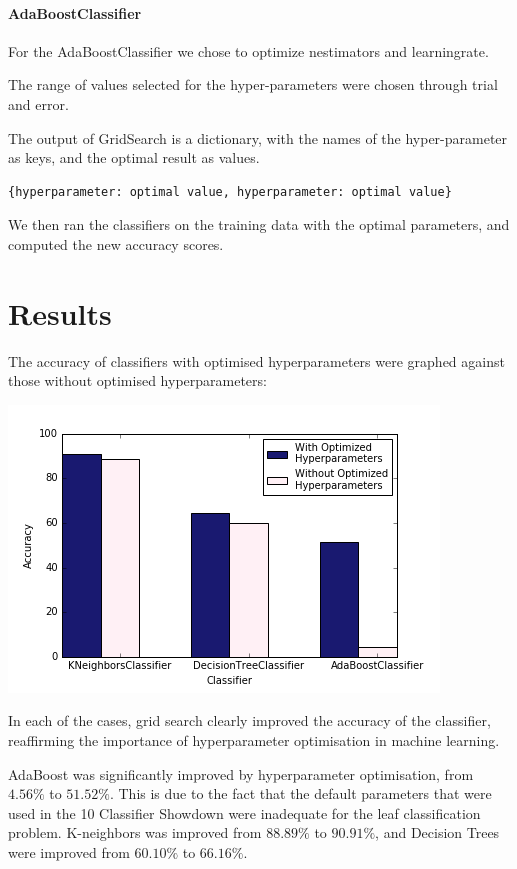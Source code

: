 \documentclass{article}
\begin{document}
		\paragraph{AdaBoostClassifier}
			For the AdaBoostClassifier we chose to optimize n\textunderscore estimators and learning\textunderscore rate. 
 			

		 The range of values selected for the hyper-parameters were chosen through trial and error. 


		
		The output of GridSearch is  a dictionary, with the names of the hyper-parameter as keys, and the optimal result as values. 
		
		\begin{lstlisting}
{hyperparameter: optimal value, hyperparameter: optimal value}
		\end{lstlisting}

	We then ran the classifiers on the training data with the optimal parameters, and computed the new accuracy scores. 





\section{Results}

The accuracy of classifiers with optimised hyperparameters were graphed against those without optimised hyperparameters:

\includegraphics[scale=0.7]{acc_class}

In each of the cases, grid search clearly improved the accuracy of the classifier, reaffirming the importance of hyperparameter optimisation in machine learning. 

AdaBoost was significantly improved by hyperparameter optimisation, from $4.56\%$ to $51.52\%$. This is due to the fact that the default parameters that were used in the 10 Classifier Showdown \cite{showdown} were inadequate for the leaf classification problem. K-neighbors was improved from $88.89\%$ to $90.91\%$, and Decision Trees were improved from $60.10\%$ to $66.16\%$. 
\end{document}
